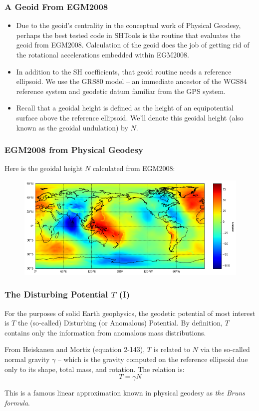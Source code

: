 \documentclass[aspectratio=43,mathserif]{beamer}
\begin{document}
\begin{frame}
\frametitle{A Geoid From EGM2008}
\begin{itemize}
\item Due to the geoid's centrality in the conceptual work of Physical Geodesy, perhaps the best tested code in SHTools is the routine that evaluates the geoid from EGM2008.  Calculation of the geoid does the job of getting rid of the rotational accelerations embedded within EGM2008.

\item In addition to the SH coefficients, that geoid routine needs a reference ellipsoid. We use the GRS80 model -- an immediate ancestor of the WGS84 reference system and geodetic datum familiar from the GPS system.

\item Recall that a geoidal height is defined as the height of an equipotential surface above the reference ellipsoid. We'll denote this geoidal height (also known as the geoidal undulation) by \(N\).
\end{itemize}

\end{frame}

\begin{frame}
\frametitle{EGM2008 from Physical Geodesy}
Here is the geoidal height \(N\) calculated from EGM2008:
\begin{figure}
\includegraphics[width=0.9\linewidth]{geoid.png}
\end{figure}

\end{frame}

\begin{frame}
\frametitle{The Disturbing Potential \(T\) (I)}

For the purposes of solid Earth geophysics, the geodetic potential of most interest is \(T\) the (so-called) Disturbing (or Anomalous) Potential. By definition, \(T\) contains only the information from anomalous mass distributions. 

From Heiskanen and Mortiz (equation 2-143), \(T\) is related to \(N\)  via the so-called normal gravity \(\gamma\) -- which is the gravity computed on the reference ellipsoid due only to its shape, total mass, and rotation. The relation is:
\[ T = \gamma N
\]

This is a famous linear approximation known in physical geodesy as \emph{the Bruns formula}.


\end{frame}
\end{document}
